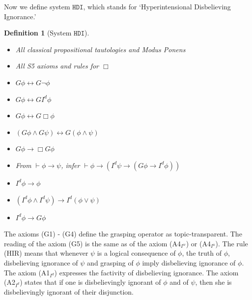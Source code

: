 \documentclass{article}
\newtheorem{defi}{Definition}
\begin{document}
Now we define system $\mathtt{HDI}$, which stands for `Hyperintensional Disbelieving Ignorance.'

\begin{defi}[System $\mathtt{HDI}$]

\

\begin{itemize}

\item[(CPL)] All classical propositional tautologies and Modus Ponens

\item[(S5$_{\Box}$)] All S5 axioms and rules for $\Box$

\item[(G1)] $G \phi \leftrightarrow G\neg \phi$

\item[(G2)] $G \phi \leftrightarrow G I^{d} \phi$

\item[(G3)] $G\phi  \leftrightarrow G \Box \phi$

\item[(G4)] $(G \phi \wedge G \psi) \leftrightarrow G (\phi \wedge \psi)$

\item[(G5)] $G\phi \rightarrow \Box G \phi$

\item[(HIR)] From $\vdash \phi \rightarrow \psi$, infer $\vdash \phi \rightarrow (I^{d} \psi \rightarrow (G \phi \rightarrow I^{d} \phi))$

\item[(A1$_{I^{d}}$)] $I^{d} \phi \rightarrow \phi$

\item[(A2$_{I^{d}}$)] $(I^{d} \phi \wedge I^{d} \psi) \rightarrow I^{d}(\phi \vee \psi)$

\item[(A3$_{I^{d}}$)] $I^{d} \phi \rightarrow G \phi$

\end{itemize}

\end{defi}

The axioms (G1) - (G4) define the grasping operator as topic-transparent. The reading of the axiom (G5) is the same as of the axiom (A4$_{I^{w}}$) or (A4$_{I^{u}}$). The rule (HIR) means that whenever $\psi$ is a logical consequence of $\phi$, the truth of $\phi$, disbelieving ignorance of $\psi$ and grasping of $\phi$ imply disbelieving ignorance of $\phi$. The axiom (A1$_{I^{d}}$) expresses the factivity of disbelieving ignorance. The axiom (A2$_{I^{d}}$) states that if one is disbelievingly ignorant of $\phi$ and of $\psi$, then she is disbelievingly ignorant of their disjunction. 
\end{document}
